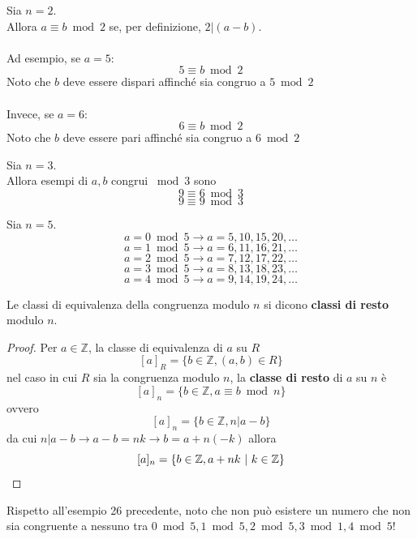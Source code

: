 \documentclass[a4paper,12pt, oneside]{book}
\begin{document}
\begin{shaded}
	\begin{esempio}
		Sia $n=2$.\\
		Allora $a \equiv b \bmod 2$ se, per definizione, $2|(a-b)$.\\\\
		Ad esempio, se $a=5$: $$5 \equiv b \bmod 2$$
		Noto che $b$ deve essere dispari affinché sia congruo a $5 \bmod 2$\\\\
		Invece, se $a=6$: $$6 \equiv b \bmod 2$$
		Noto che $b$ deve essere pari affinché sia congruo a $6 \bmod 2$
	\end{esempio}
	\begin{esempio}
		Sia $n = 3$.\\
		Allora esempi di $a,b$ congrui $\bmod 3$ sono
		$$9 \equiv 6 \bmod 3$$
		$$9 \equiv 9 \bmod 3$$
	\end{esempio}
	\begin{esempio}
		Sia $n = 5$.\\
		$$a = 0 \bmod 5 \longrightarrow a = 5, 10, 15, 20, \dots$$
		$$a = 1 \bmod 5 \longrightarrow a = 6, 11, 16, 21, \dots$$
		$$a = 2 \bmod 5 \longrightarrow a = 7, 12, 17, 22, \dots$$
		$$a = 3 \bmod 5 \longrightarrow a = 8, 13, 18, 23, \dots$$
		$$a = 4 \bmod 5 \longrightarrow a = 9, 14, 19, 24, \dots$$
	\end{esempio}
\end{shaded}
\begin{definizione}
	Le classi di equivalenza della congruenza modulo $n$ si dicono \textbf{classi di resto} modulo $n$.

	\begin{proof}
		Per $a \in \mathbb{Z}$, la classe di equivalenza di $a$ su $R$\\
		$$[a]_{R} = \{ b \in \mathbb{Z}, (a,b) \in R \}$$
		nel caso in cui $R$ sia la congruenza modulo $n$, la \textbf{classe di resto} di $a$ su $n$ è
		$$[a]_n = \{ b \in \mathbb{Z}, a \equiv b \bmod n \}$$
		ovvero
		$$[a]_n = \{ b \in \mathbb{Z}, n|a-b \}$$
		da cui $n|a-b \longrightarrow a-b=nk \longrightarrow b = a+n(-k)$ allora
		$$[a]_n = \{ b \in \mathbb{Z}, a+nk \mbox{\space} | \mbox{\space} k \in \mathbb{Z}\}$$
	\end{proof}
\end{definizione}
\begin{nota}
	Rispetto all'esempio 26 precedente, noto che non può esistere un numero che non sia congruente a nessuno tra $0 \bmod 5, 1 \bmod 5, 2 \bmod 5, 3 \bmod 1, 4 \bmod 5$!
\end{nota}
\end{document}
